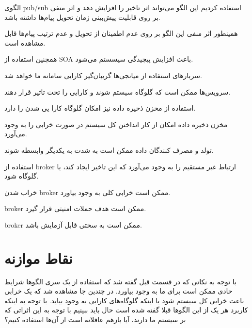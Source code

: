 \begin{itemize}

	

	 الگوی pub/sub استفاده کردیم این الگو می‌تواند اثر تاخیر را افزایش دهد و اثر منفی بر روی قابلیت پیش‌بینی زمان تحویل پیام‌ها داشته باشد.

	

	 همینطور اثر منفی این الگو بر روی عدم اطمینان از تحویل و عدم ترتیب پیام‌ها قابل مشاهده است.

	

	 همچنین استفاده از SOA باعث افزایش پیچیدگی سیسستم می‌شود.

	 سربارهای استفاده از میانجی‌ها گریبان‌گیر کارایی سامانه ما خواهد شد.

	

	 سرویس‌ها ممکن است که گلوگاه سیستم شوند و کارایی را تحت تاثیر قرار دهند.

	

	 استفاده از مخزن ذخیره داده نیز امکان گلوگاه کارا یی شدن را دارد.

	 مخزن ذخیره داده امکان از کار انداختن کل سیستم در صورت خرابی را به وجود می‌آورد.

	 تولد و مصرف کنندگان داده ممکن است به شدت به یکدیگر وابسطه شوند.

	 استفاده از broker ارتباط غیر مستقیم را به وجود می‌آورد که این تاخیر ایجاد کند، یا گلوگاه شود.

	 خراب شدن broker ممکن است خرابی کلی به وجود بیاورد.

	 ‌broker ممکن است هدف حملات امنیتی قرار گیرد.

	 broker ممکن است به سختی قابل آزمایش باشد.

\end{itemize}



\section{نقاط موازنه}

با توجه به نکاتی که در قسمت قبل گفته شد که استفاده از یک سری الگوها شرایط حادی ممکن است برای ما به وجود بیاورد. در چندین جا مشاهده شد که یک خرابی باعث خرابی کل سیستم شود یا اینکه گلوگاه‌های کارایی به وجود بیاید. با توجه به اینکه کاربرد هر یک از این الگوها قبلا گفته شده است حال باید ببینیم با توجه به این اثراتی که بر سیستم ما دارند، آیا بازهم عاقلانه است از آن‌ها استفاده کنیم؟





